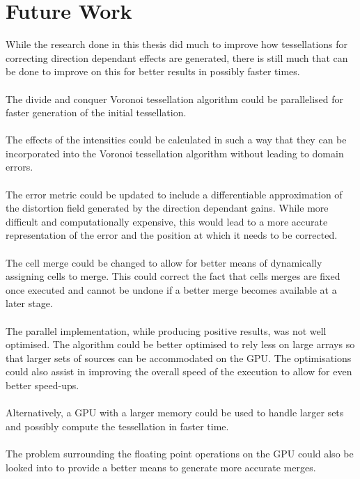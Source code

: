 \section{Future Work}
While the research done in this thesis did much to improve how tessellations for correcting direction dependant effects are generated, there is still much that can be done to improve on this for better results in possibly faster times.
\\
\\
The divide and conquer Voronoi tessellation algorithm could be parallelised for faster generation of the initial tessellation.
\\
\\
The effects of the intensities could be calculated in such a way that they can be incorporated into the Voronoi tessellation algorithm without leading to domain errors.
\\
\\
The error metric could be updated to include a differentiable approximation of the distortion field generated by the direction dependant gains. While more difficult and computationally expensive, this would lead to a more accurate representation of the error and the position at which it needs to be corrected.
\\
\\
The cell merge could be changed to allow for better means of dynamically assigning cells to merge. This could correct the fact that cells merges are fixed once executed and cannot be undone if a better merge becomes available at a later stage.
\\
\\
The parallel implementation, while producing positive results, was not well optimised. The algorithm could be better optimised to rely less on large arrays so that larger sets of sources can be accommodated on the GPU. The optimisations could also assist in improving the overall speed of the execution to allow for even better speed-ups.
\\
\\
Alternatively, a GPU with a larger memory could be used to handle larger sets and possibly compute the tessellation in faster time.
\\
\\
The problem surrounding the floating point operations on the GPU could also be looked into to provide a better means to generate more accurate merges.